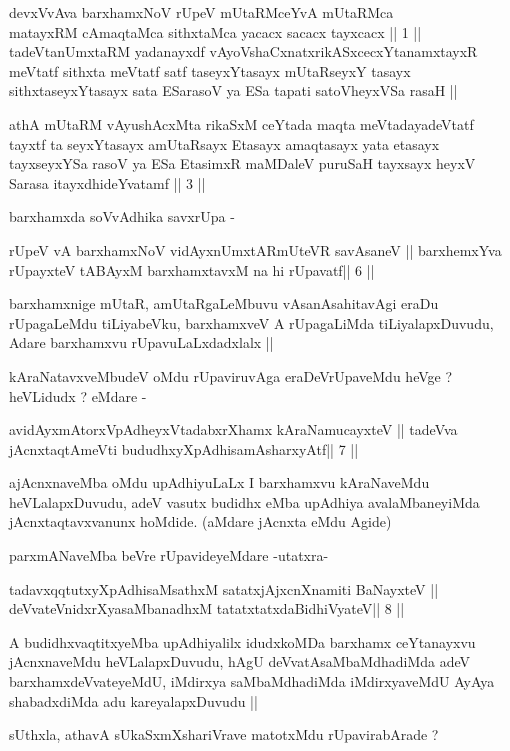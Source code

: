 \begin{shl}
devxVvAva barxhamxNoV rUpeV mUtaRMceYvA mUtaRMca\\
matayxRM cAmaqtaMca sithxtaMca yacacx sacacx tayxcacx || 1 ||
tadeVtanUmxtaRM yadanayxdf vAyoVshaCxnatxrikASxcecxYtanamxtayxR
meVtatf sithxta meVtatf satf taseyxYtasayx mUtaRseyxY tasayx
sithxtaseyxYtasayx sata ESarasoV ya ESa tapati satoVheyxVSa rasaH ||
\end{shl}

\begin{artha}
athA mUtaRM vAyushAcxMta rikaSxM ceYtada maqta meVtadayadeVtatf tayxtf
ta seyxYtasayx amUtaRsayx Etasayx amaqtasayx yata etasayx tayxseyxYSa
rasoV ya ESa EtasimxR maMDaleV puruSaH tayxsayx heyxV Sarasa
itayxdhideYvatamf || 3 || 

barxhamxda soVvAdhika savxrUpa -
\end{artha}

\begin{shl}
rUpeV vA barxhamxNoV vidAyxnUmxtARmUteVR savAsaneV ||
barxhemxYva rUpayxteV tABAyxM barxhamxtavxM na hi rUpavatf\hfill || 6 ||
\end{shl}

\begin{artha}
barxhamxnige mUtaR, amUtaRgaLeMbuvu vAsanAsahitavAgi eraDu rUpagaLeMdu
tiLiyabeVku, barxhamxveV A rUpagaLiMda tiLiyalapxDuvudu, Adare
barxhamxvu rUpavuLaLxdadxlalx ||

kAraNatavxveMbudeV oMdu rUpaviruvAga eraDeVrUpaveMdu heVge ? heVLidudx
? eMdare -
\end{artha}

\begin{shl}
avidAyxmAtorxVpAdheyxVtadabxrXhamx kAraNamucayxteV ||
tadeVva jAcnxtaqtAmeVti bududhxyXpAdhisamAsharxyAtf\hfill || 7 ||
\end{shl}

\begin{artha}
ajAcnxnaveMba oMdu upAdhiyuLaLx I barxhamxvu kAraNaveMdu
heVLalapxDuvudu, adeV vasutx budidhx eMba upAdhiya avalaMbaneyiMda
jAcnxtaqtavxvanunx hoMdide. (aMdare jAcnxta eMdu Agide)

parxmANaveMba beVre rUpavideyeMdare -utatxra-
\end{artha}

\begin{shl}
tadavxqqtutxyXpAdhisaMsathxM satatxjAjxcnXnamiti BaNayxteV ||
deVvateVnidxrXyasaMbanadhxM tatatxtatxdaBidhiVyateV\hfill || 8 ||
\end{shl}

\begin{artha}
A budidhxvaqtitxyeMba upAdhiyalilx idudxkoMDa barxhamx ceYtanayxvu
jAcnxnaveMdu heVLalapxDuvudu, hAgU deVvatAsaMbaMdhadiMda adeV
barxhamxdeVvateyeMdU, iMdirxya saMbaMdhadiMda iMdirxyaveMdU AyAya
shabadxdiMda adu kareyalapxDuvudu ||

sUthxla, athavA sUkaSxmXshariVrave matotxMdu rUpavirabArade ?
\end{artha}

